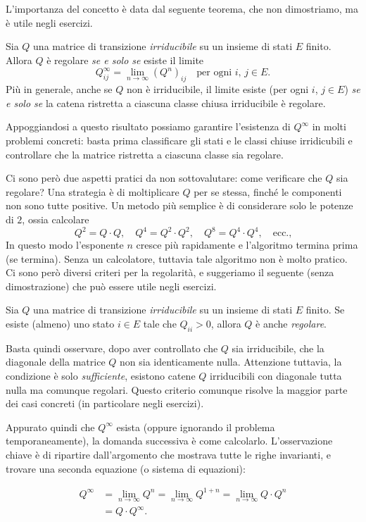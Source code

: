 \documentclass[
  italian,
  letterpaper,
]{book}
\theoremstyle{definition}
\theoremstyle{remark}
\begin{document}
L'importanza del concetto è data dal seguente teorema, che non
dimostriamo, ma è utile negli esercizi.

Sia \(Q\) una matrice di transizione \emph{irriducibile} su un insieme
di stati \(E\) finito. Allora \(Q\) è regolare \emph{se e solo se}
esiste il limite
\[ Q^\infty_{ij} = \lim_{n \to \infty}(Q^{n})_{ij} \quad \text{per ogni $i$, $j \in E$.}\]
Più in generale, anche se \(Q\) non è irriducibile, il limite esiste
(per ogni \(i\), \(j \in E\)) \emph{se e solo se} la catena ristretta a
ciascuna classe chiusa irriducibile è regolare.

Appoggiandosi a questo risultato possiamo garantire l'esistenza di
\(Q^\infty\) in molti problemi concreti: basta prima classificare gli
stati e le classi chiuse irridicubili e controllare che la matrice
ristretta a ciascuna classe sia regolare.

Ci sono però due aspetti pratici da non sottovalutare: come verificare
che \(Q\) sia regolare? Una strategia è di moltiplicare \(Q\) per se
stessa, finché le componenti non sono tutte positive. Un metodo più
semplice è di considerare solo le potenze di \(2\), ossia calcolare
\[Q^2 = Q \cdot Q, \quad Q^4 = Q^2 \cdot Q^2, \quad Q^8 = Q^4\cdot Q^4, \quad \text{ecc.,}\]
In questo modo l'esponente \(n\) cresce più rapidamente e l'algoritmo
termina prima (se termina). Senza un calcolatore, tuttavia tale
algoritmo non è molto pratico. Ci sono però diversi criteri per la
regolarità, e suggeriamo il seguente (senza dimostrazione) che può
essere utile negli esercizi.

Sia \(Q\) una matrice di transizione \emph{irriducibile} su un insieme
di stati \(E\) finito. Se esiste (almeno) uno stato \(i\in E\) tale che
\(Q_{ii}>0\), allora \(Q\) è anche \emph{regolare}.

Basta quindi osservare, dopo aver controllato che \(Q\) sia
irriducibile, che la diagonale della matrice \(Q\) non sia identicamente
nulla. Attenzione tuttavia, la condizione è solo \emph{sufficiente},
esistono catene \(Q\) irriducibili con diagonale tutta nulla ma comunque
regolari. Questo criterio comunque risolve la maggior parte dei casi
concreti (in particolare negli esercizi).

Appurato quindi che \(Q^\infty\) esista (oppure ignorando il problema
temporaneamente), la domanda successiva è come calcolarlo.
L'osservazione chiave è di ripartire dall'argomento che mostrava tutte
le righe invarianti, e trovare una seconda equazione (o sistema di
equazioni):

\[ \begin{split} Q^\infty & = \lim_{n \to \infty }Q^n = \lim_{n \to \infty } Q^{1+n} = \lim_{n \to \infty }Q\cdot Q^n\\
& = Q \cdot Q^\infty.\end{split}\]
\end{document}
